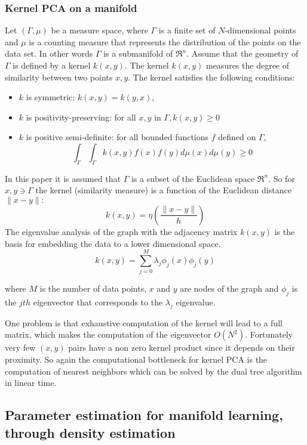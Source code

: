 \documentclass[12pt,letterpaper,doublespaced,ETD,dvips,proposal]{gtthesis}
\begin{document}
\begin{Body}
\subsubsection{Kernel PCA on a manifold} Let  $(\Gamma,\mu)$ be a
measure space, where $\Gamma$ is a finite set of $N$-dimensional
points and $\mu$ is a counting measure that represents the
distribution of the points on the data set. In other words $\Gamma$
is a submanifold of $\Re^{n}$. Assume that the geometry of $\Gamma$
is defined by a kernel $k(x,y)$. The kernel $k(x,y)$ measures the
degree of similarity between two points $x,y$. The kernel satisfies
the following conditions:
\begin{itemize}
    \item   $k$ is symmetric: $k(x,y)=k(y,x)$,
    \item   $k$ is positivity-preserving: for all $x,y$ in
$\Gamma, k(x,y)\geq 0$
    \item   $k$ is positive semi-definite: for all bounded
functions $f$ defined on  $\Gamma$,
\[
\int_{\Gamma} \int_{\Gamma} k(x,y)f(x)f(y)d\mu(x)d\mu(y)\geq 0\]
\end{itemize}
In this paper it is assumed that $\Gamma$ is a subset of the
Euclidean space $\Re^{n}$. So for $x,y\ni\Gamma$ the kernel
(similarity measure) is a function of the Euclidean distance
$\parallel x-y\parallel:$
\[
 k(x,y)=\eta(\frac{\parallel x-y\parallel}{h})
\]
The eigenvalue analysis of the graph with the adjacency matrix
$k(x,y)$ is the basis for embedding the data to a lower dimensional
space.
\[
    k(x,y)=\sum_{j=0}^{M} \lambda_{j}\phi_{j}(x)\phi_{j}(y)
\]

where $M$ is the number of data points, $x$ and $y$ are nodes of the
graph and $\phi_j$ is the $jth$ eigenvector that corresponds to the
$\lambda_j$ eigenvalue.

One problem is that exhaustive computation of the kernel will lead
to a full matrix, which makes the computation of the eigenvector
$O(N^2)$. Fortunately very few $(x,y)$ pairs have a non zero kernel
product since it depends on their proximity. So again the
computational bottleneck for kernel PCA is the computation of
nearest neighbors which can be solved by the dual tree algorithm in
linear time.

\subsection{Parameter estimation for manifold learning, through density estimation}


\end{Body}
\end{document}

